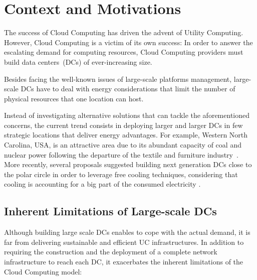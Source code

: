 \section{Context and Motivations}
\label{sec:intro}
The success of Cloud Computing has driven the advent of Utility Computing.
However, Cloud Computing is a victim of its own success: In order to answer the
escalating demand for computing resources, Cloud Computing providers must
build data centers~(DCs) of ever-increasing size.

Besides facing the well-known
issues of large-scale platforms management, large-scale DCs have to deal with
energy considerations that limit the number of physical resources that one
location can host.

Instead of investigating alternative solutions that can tackle the aforementioned 
concerns, the current trend consists in deploying larger and larger DCs in few
strategic locations that deliver energy advantages.  For example, Western North
Carolina, USA, is an attractive area due to its abundant capacity of coal
and nuclear power following the departure of the textile and furniture
industry~\cite{greenpeace:2013}.  More recently, several proposals suggested building next
generation DCs close to the polar circle  in order to leverage free cooling
techniques, considering that cooling is accounting for a big part of the
consumed electricity \cite{greenberg:sigcomm09}. 


\subsection{Inherent Limitations of Large-scale DCs}

Although building large scale DCs  enables to cope with the actual demand,
it is far from delivering sustainable and efficient UC infrastructures.  In addition
to requiring the construction and the deployment of a complete network
infrastructure to reach each DC, it exacerbates the inherent limitations of the
Cloud Computing model:

